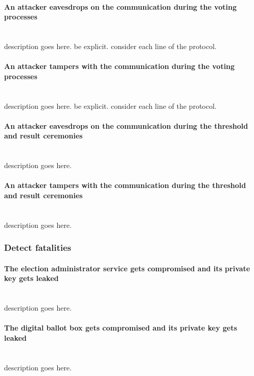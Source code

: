 \paragraph{An attacker eavesdrops on the communication during the voting processes} \mbox{} \\
description goes here.
be explicit.
consider each line of the protocol.


\paragraph{An attacker tampers with the communication during the voting processes} \mbox{} \\
description goes here.
be explicit.
consider each line of the protocol.


\paragraph{An attacker eavesdrops on the communication during the threshold and result ceremonies} \mbox{} \\
description goes here.


\paragraph{An attacker tampers with the communication during the threshold and result ceremonies} \mbox{} \\
description goes here.


\subsubsection{Detect fatalities}

\paragraph{The election administrator service gets compromised and its private key gets leaked} \mbox{} \\
description goes here.


\paragraph{The digital ballot box gets compromised and its private key gets leaked} \mbox{} \\
description goes here.
